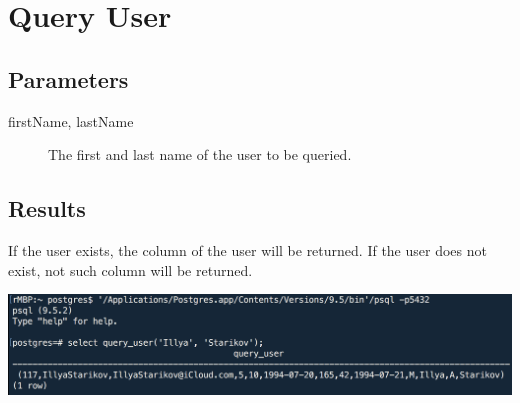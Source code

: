 \section{Query User}

\subsection{Parameters}
\begin{description}
    \item [firstName, lastName] The first and last name of the user to be queried.
\end{description}

\subsection{Results}
If the user exists, the column of the user will be returned. If the user does not exist, not such column will be returned.

\begin{center}
\includegraphics[width=\columnwidth]{include/assets/screenshots/query_user}
\end{center}